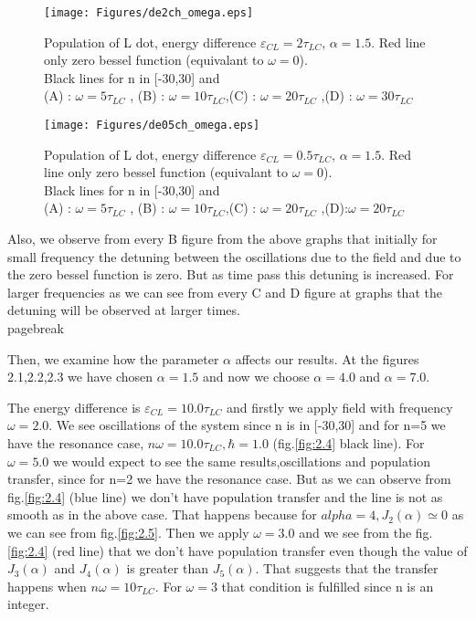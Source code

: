 \begin{figure}
\centering
\texttt{[image: Figures/de2ch\_omega.eps]}
\decoRule
\caption[Far-off resonance]{Population of L dot, energy difference $\varepsilon_{CL}=2\tau_{LC}$, $\alpha=1.5$. Red line only zero bessel function (equivalant to $\omega=0$). \\Black lines for n in [-30,30] and \\ (A) : $\omega=5\tau_{LC}$ , (B) : $\omega=10\tau_{LC}$,(C) : $\omega=20\tau_{LC}$ ,(D) : $\omega=30\tau_{LC}$}
\label{fig:2.2}
\end{figure}

\begin{figure}
\centering
\texttt{[image: Figures/de05ch\_omega.eps]}
\decoRule
\caption[Far-off resonance]{Population of L dot, energy difference $\varepsilon_{CL}=0.5\tau_{LC}$, $\alpha=1.5$. Red line only zero bessel function (equivalant to $\omega=0$). \\Black lines for n in [-30,30] and \\ (A) : $\omega=5\tau_{LC}$ , (B) : $\omega=10\tau_{LC}$,(C) : $\omega=20\tau_{LC}$ ,(D):$\omega=20\tau_{LC}$}
\label{fig:2.3}
\end{figure}

Also, we observe from every B figure from the above graphs that initially for small frequency the detuning between the oscillations due to the field and due to the zero bessel function is zero. But as time pass this detuning is increased. For larger frequencies as we can see from every C and D figure at graphs that the detuning will be observed at larger times.
\\pagebreak

Then, we examine how the parameter $\alpha$ affects our results. At the figures 2.1,2.2,2.3 we have chosen $\alpha=1.5$ and now we choose $\alpha=4.0$ and $\alpha=7.0$.

The energy difference is $\varepsilon_{CL}=10.0\tau_{LC}$ and firstly we apply field with frequency $\omega=2.0$. We see oscillations of the system  since n is in [-30,30] and for n=5 we have the resonance case, $n\omega=10.0 \tau_{LC}, \hbar=1.0$ (fig.\ref{fig:2.4} black line). For  $\omega=5.0$ we would expect to see the same results,oscillations and population transfer, since for n=2 we have the resonance case. But as we can observe from fig.\ref{fig:2.4} (blue line) we don't have population transfer and the line is not as smooth as in the above case. That happens because for $alpha=4, J_{2}(\alpha)\simeq 0$ as we can see from fig.\ref{fig:2.5}. Then we apply $\omega=3.0$ and we see from the fig.\ref{fig:2.4} (red line) that we don't have population transfer even though the value of $J_{3}(\alpha)$ and $J_{4}(\alpha)$ is greater than $J_{5}(\alpha)$. That suggests that the transfer happens when $n\omega=10\tau_{LC}$. For $\omega=3$ that condition is fulfilled since n is an integer. 

